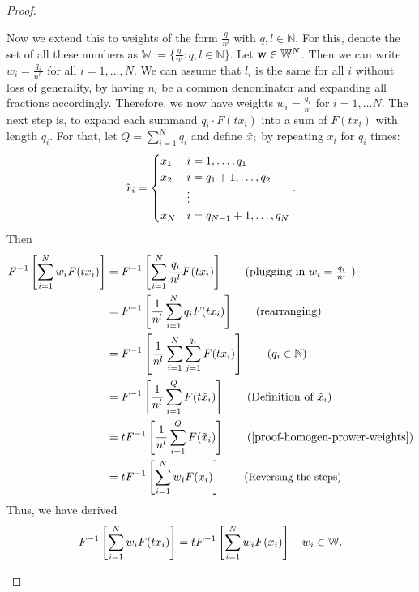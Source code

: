 \begin{proof}
\begin{proofpart}
\begin{proofpp}
			Now we extend this to weights of the form $\frac{q}{n^l}$ with $q, l \in \mathbb{N}$. For this, denote the set of all these numbers as $\mathbb{W} := \{\frac{q}{n^l}: q, l \in \mathbb{N}\}$. Let $\mathbf{w} \in \mathbb{W}^N$. Then we can write $w_i = \frac{q_i}{n^{l_i}}$ for all $i = 1, \dots, N$. We can assume that $l_i$ is the same for all $i$ without loss of generality, by having $n_l$ be a common denominator and expanding all fractions accordingly. Therefore, we now have weights $w_i = \frac{q_i}{n^l}$ for $i=1, \dots N$.
			The next step is, to expand each summand $q_i \cdot F(t x_i)$ into a sum of $F(t x_i)$ with length $q_i$.
			For that, let $Q = \sum_{i=1}^{N} q_i$ and define $\tilde {x}_i$ by repeating $x_i$ for $q_i$ times:
			$$\tilde {x}_i =
				\begin{cases}
					x_1 & i=1, \dots, q_1         \\
					x_2 & i=q_1+1, \dots, q_2     \\
					    & \vdots                  \\
					x_N & i=q_{N-1}+1, \dots, q_N
				\end{cases}.$$
			Then
			\begin{align*}
				F^{-1} \left[ \sum_{i=1}^{N} w_i F(t \ta_i) \right] & = F^{-1} \left[ \sum_{i=1}^{N} \frac{q_i}{n^l} F(t \ta_i) \right] \tag{plugging in $w_i = \frac{q_i}{n^l}$ }     \\
				                                                    & = F^{-1} \left[ \frac{1}{n^l} \sum_{i=1}^{N} q_i F(t \ta_i) \right] \tag{rearranging}                            \\
				                                                    & = F^{-1} \left[ \frac{1}{n^l} \sum_{i=1}^{N} \sum_{j=1}^{q_i} F(t \ta_i) \right] \tag{$q_i \in \mathbb{N}$}      \\
				                                                    & = F^{-1} \left[ \frac{1}{n^l} \sum_{i=1}^{Q} F(t \tilde \ta_i) \right] \tag{Definition of $\tilde \ta_i$}        \\
				                                                    & = t F^{-1} \left[ \frac{1}{n^l} \sum_{i=1}^{Q} F(\tilde \ta_i) \right] \tag{\cref{proof-homogen-prower-weights}} \\
				                                                    & = t F^{-1} \left[ \sum_{i=1}^{N} w_i F(\ta_i) \right] \tag{\small{Reversing the steps}}
			\end{align*}
			Thus, we have derived
			\begin{equation} \label{proof-homogen-rats}
				F^{-1} \left[ \sum_{i=1}^{N} w_i F(t x_i) \right] = t F^{-1} \left[ \sum_{i=1}^{N} w_i F(x_i) \right] \quad w_i \in \mathbb{W}.
			\end{equation}


\end{proofpp}
\end{proofpart}
\end{proof}
